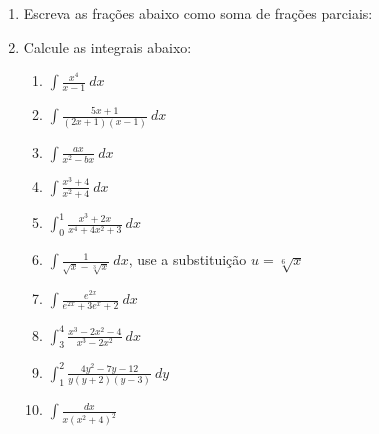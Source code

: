 \documentclass[a4paper,5pt]{amsbook}
\begin{document}
\vspace{1cm}
\begin{enumerate}
	\vspace{0.5cm}
	\item Escreva as fra\c{c}\~oes abaixo como soma de fra\c{c}\~oes parciais:

		\vspace{0.3cm}

	\vspace{0.5cm}
	\item Calcule as integrais abaixo:
		\begin{enumerate}
			\vspace{0.3cm}
			\item $\displaystyle\int\frac{x^4}{x-1}\ dx$
			\vspace{0.3cm}
			\item $\displaystyle\int\frac{5x+1}{(2x+1)(x-1)}\ dx$
			\vspace{0.3cm}
			\item $\displaystyle\int\frac{ax}{x^2-bx}\ dx$
			\vspace{0.3cm}
			\item $\displaystyle\int\frac{x^3+4}{x^2+4}\ dx$
			\vspace{0.3cm}
			\item $\displaystyle\int_0^1\frac{x^3+2x}{x^4+4x^2+3}\ dx$
			\vspace{0.3cm}
			\item $\displaystyle\int\frac{1}{\sqrt{x}-\sqrt[3]{x}}\ dx$, use a substitui\c{c}\~ao $u=\sqrt[6]{x}$
			\vspace{0.3cm}
			\item $\displaystyle\int\frac{e^{2x}}{e^{2x}+3e^x+2}\ dx$
			\vspace{0.3cm}
			\item $\displaystyle\int_3^4\frac{x^3-2x^2-4}{x^3-2x^2}\ dx$
			\vspace{0.3cm}
			\item $\displaystyle\int_1^2\frac{4y^2-7y-12}{y(y+2)(y-3)}\ dy$
			\vspace{0.3cm}
			\item $\displaystyle\int\frac{dx}{x(x^2+4)^2}$
		\end{enumerate}


\end{enumerate}
\end{document}
